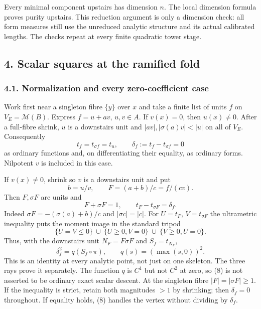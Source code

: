 \documentclass[
  11pt,
]{article}
\begin{document}
Every minimal component upstairs has dimension \(n\). The local
dimension formula proves purity upstairs. This reduction argument is
only a dimension check: all form measures still use the unreduced
analytic structure and its actual calibrated lengths. The checks repeat
at every finite quadratic tower stage.

\subsection{4. Scalar squares at the ramified
fold}\label{scalar-squares-at-the-ramified-fold}

\subsubsection{4.1. Normalization and every zero-coefficient
case}\label{normalization-and-every-zero-coefficient-case}

Work first near a singleton fibre \(\{y\}\) over \(x\) and take a finite
list of units \(f\) on \(V_E=\mathcal M(B)\). Express \(f=u+av\),
\(u,v\in A\). If \(v(x)=0\), then \(u(x)\ne0\). After a full-fibre
shrink, \(u\) is a downstairs unit and \(|av|,|\sigma(a)v|<|u|\) on all
of \(V_E\). Consequently \[
 t_f=t_{\sigma f}=t_u,\qquad \delta_f:=t_f-t_{\sigma f}=0     \tag{5}
\] as ordinary functions and, on differentiating their equality, as
ordinary forms. Nilpotent \(v\) is included in this case.

If \(v(x)\ne0\), shrink so \(v\) is a downstairs unit and put \[
 b=u/v,\qquad F=(a+b)/c=f/(cv).
\] Then \(F,\sigma F\) are units and \[
 F+\sigma F=1,\qquad
 t_F-t_{\sigma F}=\delta_f.                                \tag{6}
\] Indeed \(\sigma F=-(\sigma(a)+b)/c\) and \(|\sigma c|=|c|\). For
\(U=t_F\), \(V=t_{\sigma F}\) the ultrametric inequality puts the moment
image in the standard tripod \[
 \{U=V\leq0\}\ \cup\ \{U\geq0,V=0\}\ \cup\ \{V\geq0,U=0\}.
                                                                    \tag{7}
\] Thus, with the downstairs unit \(N_F=F\sigma F\) and \(S_f=t_{N_F}\),
\[
 \delta_f^2=q(S_f\circ\pi),\qquad q(s)=(\max(s,0))^2.        \tag{8}
\] This is an identity at every analytic point, not just on one
skeleton. The three rays prove it separately. The function \(q\) is
\(C^1\) but not \(C^2\) at zero, so (8) is not asserted to be ordinary
exact scalar descent. At the singleton fibre \(|F|=|\sigma F|\geq1\). If
the inequality is strict, retain both magnitudes \(>1\) by shrinking;
then \(\delta_f=0\) throughout. If equality holds, (8) handles the
vertex without dividing by \(\delta_f\).
\end{document}

